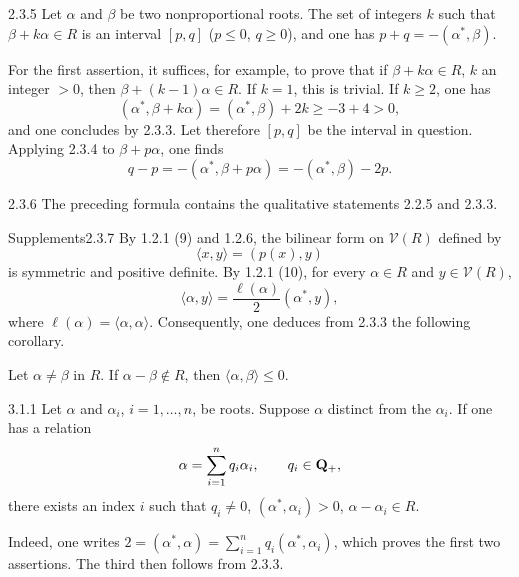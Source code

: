 \begin{proposition}{2.3.5}\label{XXI.2.3.5}
Let $\alpha$ and $\beta$ be two nonproportional roots. The set of integers $k$ such that $\beta+k\alpha\in R$ is an interval $[p,q]$ ($p\leq0$, $q\geq0$), and one has $p+q=-(\alpha^*,\beta)$.
\end{proposition}
For the first assertion, it suffices, for example, to prove that if $\beta+k\alpha\in R$, $k$ an integer $>0$, then $\beta+(k-1)\alpha\in R$. If $k=1$, this is trivial. If $k\geq2$, one has
\[
(\alpha^*,\beta+k\alpha)=(\alpha^*,\beta)+2k\geq-3+4>0,
\]
and one concludes by 2.3.3. Let therefore $[p,q]$ be the interval in question. Applying 2.3.4 to $\beta+p\alpha$, one finds
\[
q-p=-(\alpha^*,\beta+p\alpha)=-(\alpha^*,\beta)-2p.
\]
{\renewcommand{\thefootnote}{(5)}}
\begin{remark}{2.3.6}\label{XXI.2.3.6}
The preceding formula contains the qualitative statements 2.2.5 and 2.3.3.
\end{remark}
\begin{enoncerm}{Supplements}{2.3.7}\label{XXI.2.3.7}
{\renewcommand{\thefootnote}{(6)}}%
By 1.2.1 (9) and 1.2.6, the bilinear form on $\mathcal V(R)$ defined by
\[
\langle x,y\rangle=(p(x),y)
\]
is symmetric and positive definite. By 1.2.1 (10), for every $\alpha\in R$ and $y\in\mathcal V(R)$,
\[
\langle\alpha,y\rangle=\frac{\ell(\alpha)}2(\alpha^*,y),
\]
where $\ell(\alpha)=\langle\alpha,\alpha\rangle$. Consequently, one deduces from 2.3.3 the following corollary.
\end{enoncerm}
\begin{corollary}{}\label{XXI.2.3.7.corollary}
Let $\alpha\ne\beta$ in $R$. If $\alpha-\beta\notin R$, then $\langle\alpha,\beta\rangle\leq0$.
\end{corollary}

\label{XXI.sec.3}
\begin{lemma}{3.1.1}\label{XXI.3.1.1}
Let $\alpha$ and $\alpha_i$, $i=1,\ldots,n$, be roots. Suppose $\alpha$ distinct from the $\alpha_i$. If one has a relation
\[
\alpha=\sum_{i=1}^nq_i\alpha_i,\qquad q_i\in\mathbf{Q}_+,
\]
there exists an index $i$ such that $q_i\ne0$, $(\alpha^*,\alpha_i)>0$, $\alpha-\alpha_i\in R$.
\end{lemma}
Indeed, one writes $2=(\alpha^*,\alpha)=\sum_{i=1}^nq_i(\alpha^*,\alpha_i)$, which proves the first two assertions. The third then follows from 2.3.3.

